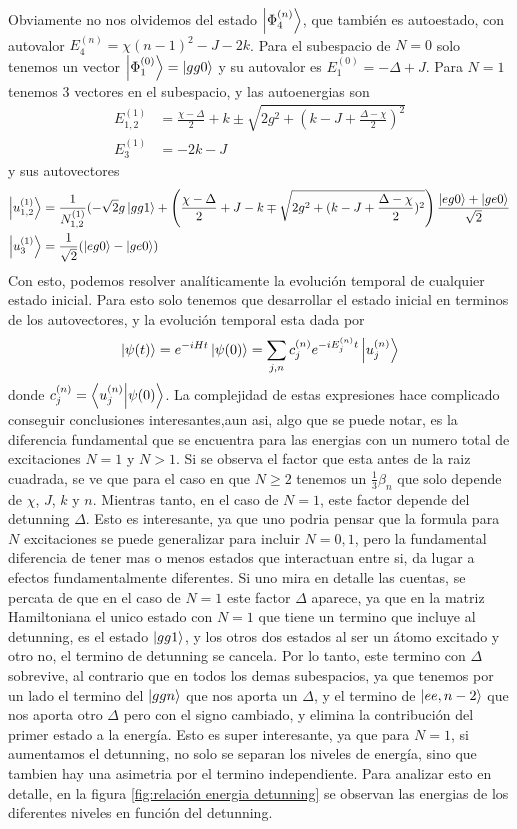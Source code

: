 Obviamente no nos olvidemos del estado $\ket{\Phi_4^{(n)}}$, que tambi\'en es autoestado, con autovalor $E_4^{(n)}=\chi(n-1)^2-J-2k$.
Para el subespacio de $N=0$ solo tenemos un vector $\ket{\Phi_1^{(0)}}=\ket{gg0}$ y su autovalor es $E_1^{(0)}=-\Delta+J$.
Para $N=1$ tenemos 3 vectores en el subespacio, y las autoenergias son
\begin{align}
    E_{1,2}^{(1)} &=\frac{\chi -\Delta}{2} +k \pm \sqrt{2g^2+(k-J+\frac{\Delta -\chi}{2} )^2} \\
    E_3^{(1)} & = -2k-J 
\end{align}
y sus autovectores
\begin{align}
    \ket{u_{1,2}^{(1)}}&=\frac{1}{N_{1,2}^{(1)}}(-\sqrt{2}g\ket{gg1}+ \left(\frac{\chi-\Delta}{2}+J-k \mp \sqrt{2g^2+(k-J+\frac{\Delta -\chi}{2} )^2} \right)\dfrac{\ket{eg0}+\ket{ge0}}{\sqrt{2}}\\
    \ket{u_3^{(1)}}&= \frac{1}{\sqrt{2}}(\ket{eg0}-\ket{ge0})
\end{align}
Con esto, podemos resolver analíticamente la evolución temporal de cualquier estado inicial.
Para esto solo tenemos que desarrollar el estado inicial en terminos de los autovectores, y la evolución temporal esta dada por
\begin{equation}
\ket{\psi(t)}=e^{-iHt}\ket{\psi(0)}=\sum_{j,n} c_j^{(n)}e^{-iE_j^{(n)}t}\ket{u_j^{(n)}}
\end{equation}
donde $c_j^{(n)}=\braket{u_j^{(n)}}{\psi(0)}$.
La complejidad de estas expresiones hace complicado conseguir conclusiones interesantes,aun asi, algo que se puede notar, es la diferencia fundamental que se encuentra para las energias con un numero total de excitaciones $N=1$ y $N>1$. Si se observa el factor que esta antes de la raiz cuadrada,  se ve que para el caso en que $N \geq 2$ tenemos un $\frac{1}{3}\beta_n$ que solo depende de $\chi$, $J$, $k$ y $n$. Mientras tanto, en el caso de $N=1$, este factor depende del detunning $\Delta$. Esto es interesante, ya que uno podria pensar que la formula para $N$ excitaciones se puede generalizar para incluir $N=0,1$, pero la fundamental diferencia de tener mas o menos estados que interactuan entre si, da lugar a efectos fundamentalmente diferentes. Si uno mira en detalle las cuentas, se percata de que en el caso de $N=1$ este factor $\Delta$ aparece, ya que en la matriz Hamiltoniana el unico estado con $N=1$ que tiene un termino que incluye al detunning, es el estado $\ket{gg1}$, y los otros dos estados al ser un átomo excitado y otro no, el termino de detunning se cancela. Por lo tanto, este termino con $\Delta$ sobrevive, al contrario que en todos los demas subespacios, ya que tenemos por un lado el termino del $\ket{ggn}$ que nos aporta un $\Delta$, y el termino de $\ket{ee,n-2}$ que nos aporta otro $\Delta$ pero con el signo cambiado, y elimina la contribución del primer estado a la energía. Esto es super interesante, ya que para $N=1$, si aumentamos el detunning, no solo se separan los niveles de energía, sino que tambien hay una asimetria por el termino independiente. Para analizar esto en detalle, en la figura \ref{fig:relación energia detunning} se observan las energias de los diferentes niveles en función del detunning. 

